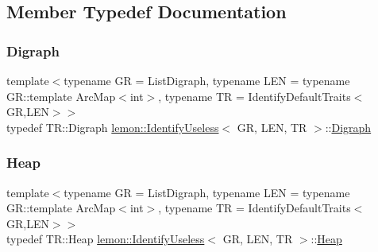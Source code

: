\subsection{Member Typedef Documentation}
\mbox{\label{classlemon_1_1_identify_useless_a68c5b16f64c42ef8d89c3d4c467aad06}} 
\subsubsection{\texorpdfstring{Digraph}{Digraph}}
{\footnotesize\ttfamily template$<$typename GR  = List\+Digraph, typename L\+EN  = typename G\+R\+::template Arc\+Map$<$int$>$, typename TR  = Identify\+Default\+Traits$<$\+G\+R,\+L\+E\+N$>$$>$ \\
typedef T\+R\+::\+Digraph \hyperlink{classlemon_1_1_identify_useless}{lemon\+::\+Identify\+Useless}$<$ GR, L\+EN, TR $>$\+::\hyperlink{classlemon_1_1_identify_useless_a68c5b16f64c42ef8d89c3d4c467aad06}{Digraph}}

\mbox{\label{classlemon_1_1_identify_useless_af836320346e1d014d8bfe6d9e17400ac}} 
\subsubsection{\texorpdfstring{Heap}{Heap}}
{\footnotesize\ttfamily template$<$typename GR  = List\+Digraph, typename L\+EN  = typename G\+R\+::template Arc\+Map$<$int$>$, typename TR  = Identify\+Default\+Traits$<$\+G\+R,\+L\+E\+N$>$$>$ \\
typedef T\+R\+::\+Heap \hyperlink{classlemon_1_1_identify_useless}{lemon\+::\+Identify\+Useless}$<$ GR, L\+EN, TR $>$\+::\hyperlink{classlemon_1_1_identify_useless_af836320346e1d014d8bfe6d9e17400ac}{Heap}}

\mbox{\label{classlemon_1_1_identify_useless_a8028f36ab31388d786049d08dfce2453}} 
